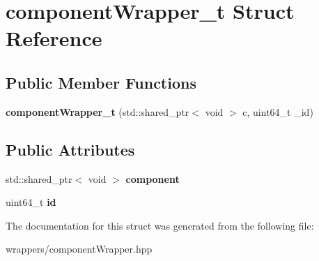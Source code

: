 \hypertarget{structcomponent_wrapper__t}{}\section{component\+Wrapper\+\_\+t Struct Reference}
\label{structcomponent_wrapper__t}
\subsection*{Public Member Functions}
\begin{DoxyCompactItemize}
\item 
\mbox{\label{structcomponent_wrapper__t_adbffb85d2e94fade3648baf5b2fdb3b0}} 
{\bfseries component\+Wrapper\+\_\+t} (std\+::shared\+\_\+ptr$<$ void $>$ c, uint64\+\_\+t \+\_\+id)
\end{DoxyCompactItemize}
\subsection*{Public Attributes}
\begin{DoxyCompactItemize}
\item 
\mbox{\label{structcomponent_wrapper__t_a2ba0f6c96cc8e26401df3fecb346bf3f}} 
std\+::shared\+\_\+ptr$<$ void $>$ {\bfseries component}
\item 
\mbox{\label{structcomponent_wrapper__t_ac910faeaba296c9b3005d7a57dfedbc4}} 
uint64\+\_\+t {\bfseries id}
\end{DoxyCompactItemize}


The documentation for this struct was generated from the following file\+:\begin{DoxyCompactItemize}
\item 
wrappers/component\+Wrapper.\+hpp\end{DoxyCompactItemize}
